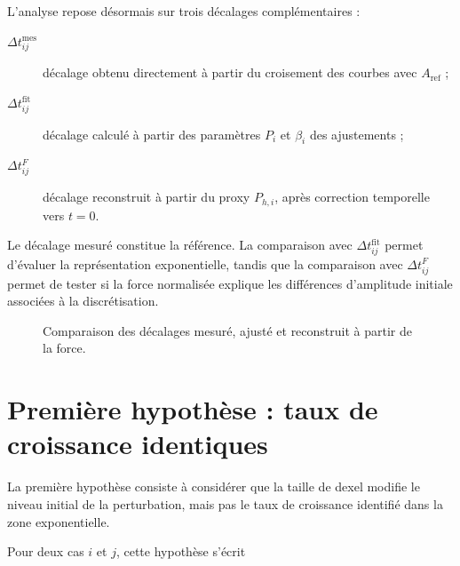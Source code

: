 \documentclass[
    11pt,
    a4paper
]{article}
\begin{document}
L’analyse repose désormais sur trois décalages complémentaires :

\begin{description}
    \item[\(\Delta t_{ij}^{\mathrm{mes}}\)] décalage obtenu directement à partir
    du croisement des courbes avec \(A_{\mathrm{ref}}\) ;

    \item[\(\Delta t_{ij}^{\mathrm{fit}}\)] décalage calculé à partir des
    paramètres \(P_i\) et \(\beta_i\) des ajustements ;

    \item[\(\Delta t_{ij}^{F}\)] décalage reconstruit à partir du proxy
    \(P_{h,i}\), après correction temporelle vers \(t=0\).
\end{description}

Le décalage mesuré constitue la référence. La comparaison avec
\(\Delta t_{ij}^{\mathrm{fit}}\) permet d’évaluer la représentation
exponentielle, tandis que la comparaison avec \(\Delta t_{ij}^{F}\) permet de
tester si la force normalisée explique les différences d’amplitude initiale
associées à la discrétisation.

\begin{figure}[H]
    \centering
    \caption{Comparaison des décalages mesuré, ajusté et reconstruit à partir de la force.}
    \label{fig:comparaison-trois-decalages}
\end{figure}



\section{Première hypothèse : taux de croissance identiques}
\label{sec:beta-identiques}

La première hypothèse consiste à considérer que la taille de dexel modifie le
niveau initial de la perturbation, mais pas le taux de croissance identifié dans
la zone exponentielle.

Pour deux cas \(i\) et \(j\), cette hypothèse s’écrit
\end{document}
